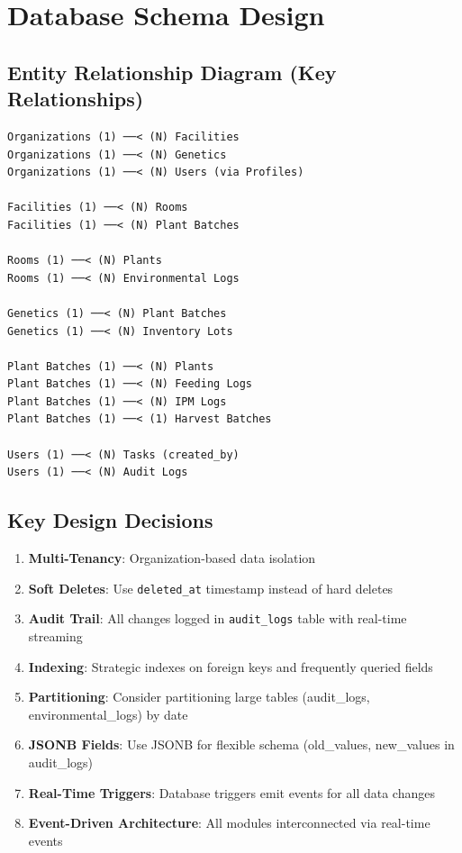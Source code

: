 \documentclass[11pt,a4paper]{article}
\begin{document}
\section{Database Schema Design}

\subsection{Entity Relationship Diagram (Key Relationships)}
\begin{codebox}
\begin{verbatim}
Organizations (1) ──< (N) Facilities
Organizations (1) ──< (N) Genetics
Organizations (1) ──< (N) Users (via Profiles)

Facilities (1) ──< (N) Rooms
Facilities (1) ──< (N) Plant Batches

Rooms (1) ──< (N) Plants
Rooms (1) ──< (N) Environmental Logs

Genetics (1) ──< (N) Plant Batches
Genetics (1) ──< (N) Inventory Lots

Plant Batches (1) ──< (N) Plants
Plant Batches (1) ──< (N) Feeding Logs
Plant Batches (1) ──< (N) IPM Logs
Plant Batches (1) ──< (1) Harvest Batches

Users (1) ──< (N) Tasks (created_by)
Users (1) ──< (N) Audit Logs
\end{verbatim}
\end{codebox}

\subsection{Key Design Decisions}
\begin{enumerate}
    \item \textbf{Multi-Tenancy}: Organization-based data isolation
    \item \textbf{Soft Deletes}: Use \texttt{deleted\_at} timestamp instead of hard deletes
    \item \textbf{Audit Trail}: All changes logged in \texttt{audit\_logs} table with real-time streaming
    \item \textbf{Indexing}: Strategic indexes on foreign keys and frequently queried fields
    \item \textbf{Partitioning}: Consider partitioning large tables (audit\_logs, environmental\_logs) by date
    \item \textbf{JSONB Fields}: Use JSONB for flexible schema (old\_values, new\_values in audit\_logs)
    \item \textbf{Real-Time Triggers}: Database triggers emit events for all data changes
    \item \textbf{Event-Driven Architecture}: All modules interconnected via real-time events
\end{enumerate}
\end{document}
